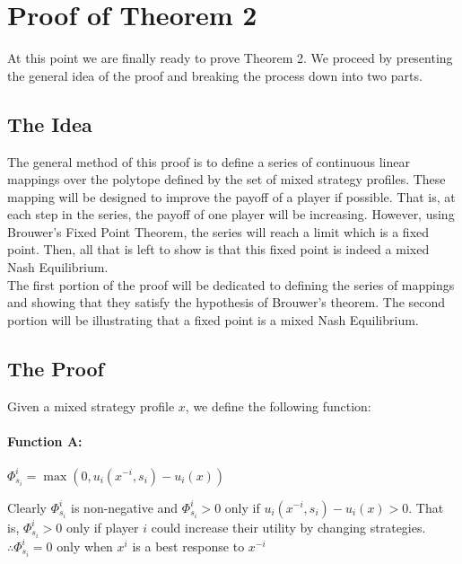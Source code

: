 \documentclass[12pt]{article}
\begin{document}
\section{Proof of Theorem 2}

At this point we are finally ready to prove Theorem 2. We proceed by presenting the general idea of the proof and breaking the process down into two parts.\\

\subsection{The Idea}

The general method of this proof is to define a series of continuous linear mappings over the polytope defined by the set of mixed strategy profiles. These mapping will be designed to improve the payoff of a player if possible. That is, at each step in the series, the payoff of one player will be increasing. However, using Brouwer’s Fixed Point Theorem, the series will reach a limit which is a fixed point. Then, all that is left to show is that this fixed point is indeed a mixed Nash Equilibrium.\\

The first portion of the proof will be dedicated to defining the series of mappings and showing that they satisfy the hypothesis of Brouwer’s theorem. The second portion will be illustrating that a fixed point is a mixed Nash Equilibrium.

\subsection{The Proof}

Given a mixed strategy profile $x$, we define the following function:

\paragraph{Function A:} $\Phi^i_{s_i} = \max(0,u_i(x^{-i},s_i) - u_i(x))$

Clearly $\Phi^i_{s_i}$ is non-negative and $\Phi^i_{s_i} > 0$ only if $u_i(x^{-i},s_i) - u_i(x) > 0$. That is, $\Phi^i_{s_i} > 0$ only if player $i$ could increase their utility by changing strategies.\\

$\therefore \Phi^i_{s_i} = 0$ only when $x^i$ is a best response to $x^{-i}$\\
\end{document}
